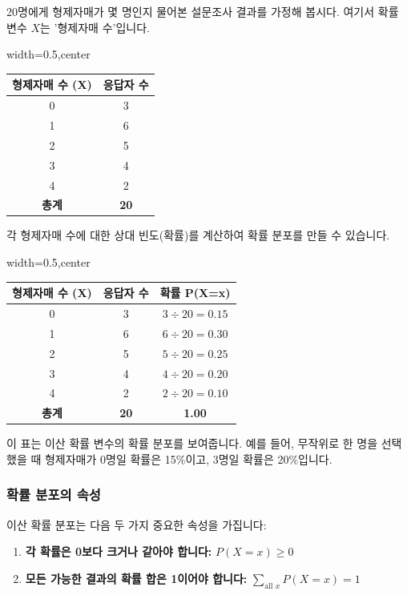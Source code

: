 \documentclass[11pt,a4paper]{book}
\theoremstyle{definition}
\begin{document}
\begin{examplebox}[title={확률 분포 예시: 형제자매 수}]
20명에게 형제자매가 몇 명인지 물어본 설문조사 결과를 가정해 봅시다. 여기서 확률 변수 \(X\)는 '형제자매 수'입니다.

\begin{adjustbox}{width=0.5\textwidth,center}
\begin{tabular}{cc}
\toprule
\textbf{형제자매 수 (X)} & \textbf{응답자 수} \\
\midrule
0 & 3 \\
1 & 6 \\
2 & 5 \\
3 & 4 \\
4 & 2 \\
\midrule
\textbf{총계} & \textbf{20} \\
\bottomrule
\end{tabular}
\end{adjustbox}

각 형제자매 수에 대한 상대 빈도(확률)를 계산하여 확률 분포를 만들 수 있습니다.

\begin{adjustbox}{width=0.5\textwidth,center}
\begin{tabular}{ccc}
\toprule
\textbf{형제자매 수 (X)} & \textbf{응답자 수} & \textbf{확률 P(X=x)} \\
\midrule
0 & 3 & \(3 \div 20 = 0.15\) \\
1 & 6 & \(6 \div 20 = 0.30\) \\
2 & 5 & \(5 \div 20 = 0.25\) \\
3 & 4 & \(4 \div 20 = 0.20\) \\
4 & 2 & \(2 \div 20 = 0.10\) \\
\midrule
\textbf{총계} & \textbf{20} & \textbf{1.00} \\
\bottomrule
\end{tabular}
\end{adjustbox}

이 표는 이산 확률 변수의 확률 분포를 보여줍니다. 예를 들어, 무작위로 한 명을 선택했을 때 형제자매가 0명일 확률은 15\%이고, 3명일 확률은 20\%입니다.
\end{examplebox}

\subsubsection*{확률 분포의 속성}
이산 확률 분포는 다음 두 가지 중요한 속성을 가집니다:
\begin{enumerate}
    \item \textbf{각 확률은 0보다 크거나 같아야 합니다:} \(P(X=x) \ge 0\)
    \item \textbf{모든 가능한 결과의 확률 합은 1이어야 합니다:} \( \sum_{\text{all } x} P(X=x) = 1 \)
\end{enumerate}
\end{document}
